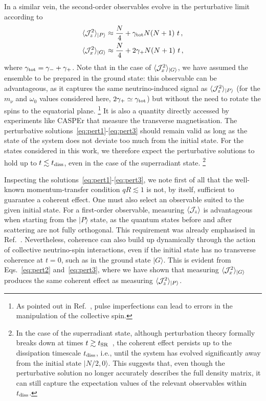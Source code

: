 \documentclass[aps,prd,10pt,twocolumn,superscriptaddress,floatfix,nofootinbib,amsmath,amssymb,altaffilletter,preprintnumbers]{revtex4-1}
\begin{document}
In a similar vein, the second-order observables evolve in the perturbative limit according to
\begin{align}
   \langle {\cal J}^2_z\rangle_{\vert P\rangle}&\approx \frac{N}{4}+\gamma_{\rm tot}N(N+1)~t\, ,\label{eq:pert2} \\
   \langle {\cal J}^2_x\rangle_{\vert G\rangle}&\approx \frac{N}{4}+2\gamma_{+}N(N+1)~t\,,
   \label{eq:pert3} 
\end{align} 
where $\gamma_{\rm tot}=\gamma_-+\gamma_+$.  Note that in the case of $\langle {\cal J}^2_x\rangle_{|G\rangle}$, we have assumed the ensemble to be prepared in the ground state: this observable can be advantageous, as it captures the same neutrino-induced signal as $\langle {\cal J}_z^2 \rangle_{\vert P\rangle}$ 
(for the $m_\nu$ and $\omega_0$ values considered here, $2\gamma_+\simeq \gamma_{\rm tot}$) but 
without the need to rotate the spins to the equatorial plane.%
%
\footnote{As pointed out in Ref.~\cite{Boyers:2025qgc}, pulse imperfections can lead to errors in the manipulation of the collective spin.}
%
It is also a quantity directly accessed by experiments like CASPEr that measure the transverse magnetisation. 
%
The perturbative solutions~\eqref{eq:pert1}-\eqref{eq:pert3} should remain valid as long as the state of the system does not deviate too much from the initial state. For the states considered in this work, we therefore expect the perturbative solutions to hold up to $t \lesssim t_{\rm diss}$, even in the case of the superradiant state.%
\footnote{In the case of the superradiant state, although perturbation theory formally breaks down at times $t\gtrsim t_{\rm SR}$~\cite{Arvanitaki:2024taq}, the coherent effect persists up to  the dissipation timescale $t_{\rm diss}$, i.e., until the system has evolved significantly away from the initial state $\vert N/2, 0\rangle$. This suggests that, even though the perturbative solution no longer accurately describes the full density matrix, it can still capture the expectation values of the relevant observables within $t_{\rm diss}$.}


Inspecting the solutions~\eqref{eq:pert1}-\eqref{eq:pert3}, we note first of all that the well-known momentum-transfer condition $qR \lesssim 1$ is not, by itself, sufficient to guarantee a coherent effect. One must also select an observable suited to the given initial state. For a first-order observable, measuring $\langle{\cal J}_{z}\rangle$ is advantageous when starting from the $\vert P\rangle$ state, as the quantum states before and after scattering are not fully orthogonal. This requirement was already emphasised in Ref.~\cite{Arvanitaki:2024taq}. Nevertheless, coherence can also build up dynamically through the action of collective neutrino-spin interactions, even if the initial state has no transverse coherence at $t=0$, such as in the ground state $\vert G\rangle$. This is evident from Eqs.~\eqref{eq:pert2} and~\eqref{eq:pert3}, where we have shown that measuring $\langle{\cal J}^2_x\rangle_{\vert G\rangle}$ produces the same coherent effect as measuring $\langle{\cal J}^2_z\rangle_{\vert P\rangle}$. 
\end{document}
